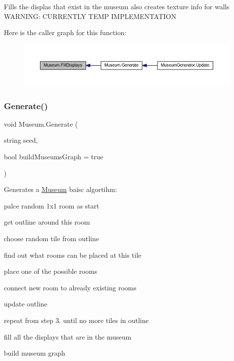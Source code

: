 Fills the displas that exist in the museum also creates texture info for walls W\+A\+R\+N\+I\+NG\+: C\+U\+R\+R\+E\+N\+T\+LY T\+E\+MP I\+M\+P\+L\+E\+M\+E\+N\+T\+A\+T\+I\+ON 

Here is the caller graph for this function\+:
\nopagebreak
\begin{figure}[H]
\begin{center}
\leavevmode
\includegraphics[width=350pt]{class_museum_ae07741bc8fd7f97c84fed0050e18c3c4_icgraph}
\end{center}
\end{figure}
\mbox{\label{class_museum_a2a301b4e27f35da164ffa03b3d3d7e81}} 
\subsubsection{\texorpdfstring{Generate()}{Generate()}}
{\footnotesize\ttfamily void Museum.\+Generate (\begin{DoxyParamCaption}\item[{string}]{seed,  }\item[{bool}]{build\+Museums\+Graph = {\ttfamily true} }\end{DoxyParamCaption})}



Generates a \mbox{\hyperlink{class_museum}{Museum}} baisc algortihm\+: 


\begin{DoxyEnumerate}
\item palce random 1x1 room as start
\item get outline around this room
\item choose random tile from outline
\item find out what rooms can be placed at this tile
\item place one of the possible rooms
\item connect new room to already existing rooms
\item update outline
\item repeat from step 3. until no more tiles in outline
\item fill all the displays that are in the museum
\item build museum graph 
\end{DoxyEnumerate}



